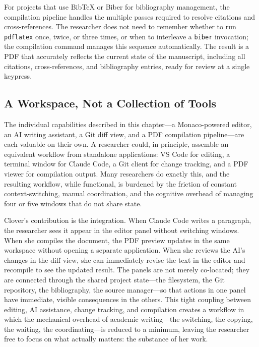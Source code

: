 \documentclass[a4paper,11pt]{article}
\begin{document}
For projects that use BibTeX or Biber for bibliography management, the compilation pipeline handles the multiple passes required to resolve citations and cross-references. The researcher does not need to remember whether to run \texttt{pdflatex} once, twice, or three times, or when to interleave a \texttt{biber} invocation; the compilation command manages this sequence automatically. The result is a PDF that accurately reflects the current state of the manuscript, including all citations, cross-references, and bibliography entries, ready for review at a single keypress.

\subsection{A Workspace, Not a Collection of Tools}

The individual capabilities described in this chapter---a Monaco-powered editor, an AI writing assistant, a Git diff view, and a PDF compilation pipeline---are each valuable on their own. A researcher could, in principle, assemble an equivalent workflow from standalone applications: VS Code for editing, a terminal window for Claude Code, a Git client for change tracking, and a PDF viewer for compilation output. Many researchers do exactly this, and the resulting workflow, while functional, is burdened by the friction of constant context-switching, manual coordination, and the cognitive overhead of managing four or five windows that do not share state.

Clover's contribution is the integration. When Claude Code writes a paragraph, the researcher sees it appear in the editor panel without switching windows. When she compiles the document, the PDF preview updates in the same workspace without opening a separate application. When she reviews the AI's changes in the diff view, she can immediately revise the text in the editor and recompile to see the updated result. The panels are not merely co-located; they are connected through the shared project state---the filesystem, the Git repository, the bibliography, the source manager---so that actions in one panel have immediate, visible consequences in the others. This tight coupling between editing, AI assistance, change tracking, and compilation creates a workflow in which the mechanical overhead of academic writing---the switching, the copying, the waiting, the coordinating---is reduced to a minimum, leaving the researcher free to focus on what actually matters: the substance of her work.
\end{document}
